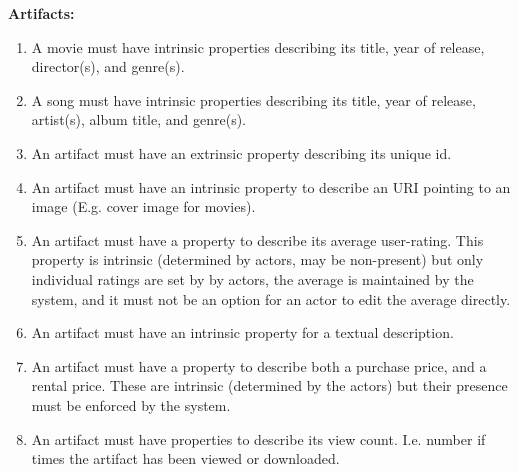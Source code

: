 \textbf{Artifacts:}
\begin{enumerate}
\item A movie must have intrinsic properties describing its title, year of
	release, director(s), and genre(s).
\item A song must have intrinsic properties describing its title, year of
	release, artist(s), album title, and genre(s).
\item An artifact must have an extrinsic property describing its unique id.
\item An artifact must have an intrinsic property to describe an URI pointing to
	an image (E.g. cover image for movies).
\item An artifact must have a property to describe its average
	user-rating. This property is intrinsic (determined by actors, may be
	non-present) but only individual ratings are set by by actors, the
	average is maintained by the system, and it must not be an option for an
	actor to edit the average directly.
\item An artifact must have an intrinsic property for a textual description.
\item An artifact must have a property to describe both a purchase price, and a
	rental price. These are intrinsic (determined by the actors) but their
	presence must be enforced by the system. \label{itm:priceReq}
\item An artifact must have properties to describe its view count. I.e. number
	if times the artifact has been viewed or downloaded.
\setcounter{enumTemp}{\theenumi}
\end{enumerate}


